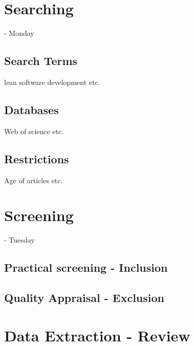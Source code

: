 

\section{Searching} - Monday
\subsection{Search Terms}
lean software development etc.

\subsection{Databases}
Web of science etc.


\subsection{Restrictions}
Age of articles etc.



\section{Screening} - Tuesday
\subsection{Practical screening - Inclusion}

\subsection{Quality Appraisal - Exclusion}





\section{Data Extraction - Review}




